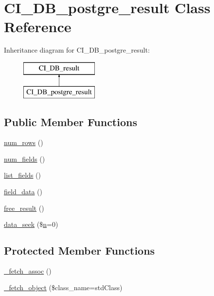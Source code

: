 \hypertarget{class_c_i___d_b__postgre__result}{}\section{C\+I\+\_\+\+D\+B\+\_\+postgre\+\_\+result Class Reference}
\label{class_c_i___d_b__postgre__result}
Inheritance diagram for C\+I\+\_\+\+D\+B\+\_\+postgre\+\_\+result\+:\begin{figure}[H]
\begin{center}
\leavevmode
\includegraphics[height=2.000000cm]{class_c_i___d_b__postgre__result}
\end{center}
\end{figure}
\subsection*{Public Member Functions}
\begin{DoxyCompactItemize}
\item 
\mbox{\hyperlink{class_c_i___d_b__postgre__result_a218657c303ee499b97710ab0cd2f5d6e}{num\+\_\+rows}} ()
\item 
\mbox{\hyperlink{class_c_i___d_b__postgre__result_af831bf363e4d7d661a717a4932af449d}{num\+\_\+fields}} ()
\item 
\mbox{\hyperlink{class_c_i___d_b__postgre__result_a50b54eb4ea7cfd039740f532988ea776}{list\+\_\+fields}} ()
\item 
\mbox{\hyperlink{class_c_i___d_b__postgre__result_a84bffd65e53902ade1591716749a33e3}{field\+\_\+data}} ()
\item 
\mbox{\hyperlink{class_c_i___d_b__postgre__result_aad2d98d6beb3d6095405356c6107b473}{free\+\_\+result}} ()
\item 
\mbox{\hyperlink{class_c_i___d_b__postgre__result_a8255ae91816e4206e29eb7581c5af0f1}{data\+\_\+seek}} (\$\mbox{\hyperlink{cli_2error__php_8php_a2e6b16bbc42094e4c51ade3c10afdcf1}{n}}=0)
\end{DoxyCompactItemize}
\subsection*{Protected Member Functions}
\begin{DoxyCompactItemize}
\item 
\mbox{\hyperlink{class_c_i___d_b__postgre__result_a43a9a92817f1334a1c10752ec44275a0}{\+\_\+fetch\+\_\+assoc}} ()
\item 
\mbox{\hyperlink{class_c_i___d_b__postgre__result_a60806be6a9c2488820813c2a7f4fef71}{\+\_\+fetch\+\_\+object}} (\$class\+\_\+name=\textquotesingle{}std\+Class\textquotesingle{})
\end{DoxyCompactItemize}
